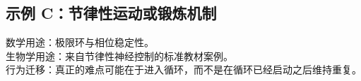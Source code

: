 \subsection*{示例 C：节律性运动或锻炼机制}

数学用途：极限环与相位稳定性。\\
生物学用途：来自节律性神经控制的标准教材案例。\\
行为迁移：真正的难点可能在于进入循环，而不是在循环已经启动之后维持重复。